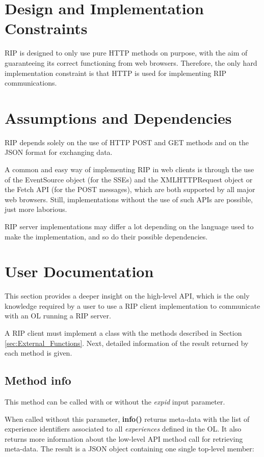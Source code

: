 \section{Design and Implementation Constraints}
RIP is designed to only use pure HTTP methods on purpose, with the aim of guaranteeing its correct functioning from web browsers. Therefore, the only hard implementation constraint is that HTTP is used for implementing RIP communications.

\section{Assumptions and Dependencies}
RIP depends solely on the use of HTTP POST and GET methods and on the JSON format for exchanging data. 

A common and easy way of implementing RIP in web clients is through the use of the EventSource object \cite{eventsource} (for the SSEs) and the XMLHTTPRequest object \cite{xhr} or the Fetch API \cite{fetch} (for the POST messages), which are both supported by all major web browsers. Still, implementations without the use of such APIs are possible, just more laborious. 

RIP server implementations may differ a lot depending on the language used to make the implementation, and so do their possible dependencies.

\section{User Documentation}
This section provides a deeper insight on the high-level API, which is the only knowledge required by a user to use a RIP client implementation to communicate with an OL running a RIP server.

A RIP client must implement a class with the methods described in Section \ref{sec:External_Functions}. Next, detailed information of the result returned by each method is given.

\subsection{Method info}
This method can be called with or without the \textit{expid} input parameter.

When called without this parameter, \textbf{info()} returns meta-data with the list of experience identifiers associated to all \textit{experiences} defined in the OL. It also returns more information about the low-level API method call for retrieving meta-data. The result is a JSON object containing one single top-level member:

